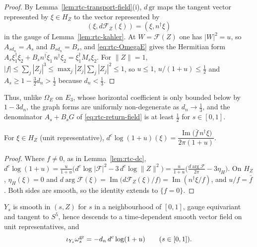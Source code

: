\begin{proof}
By Lemma~\ref{lem:rtc-transport-field}(i), $d\,\mathrm{gr}$ maps the tangent vector represented by $\xi\in H_Z$ to the vector represented by
\[
 (\xi,d\mathcal F_Z(\xi))=(\xi,n^\dagger\xi)
\]
in the gauge of Lemma~\ref{lem:rtc-kahler}. At
$W=\mathcal F(Z)$ one has $|W|^2=u$, so $A_{sd_n}=A_s$ and $B_{sd_n}=B_s$, and \eqref{eq:rtc-OmegaE} gives the Hermitian form
$A_s\xi_1^\dagger\xi_2+B_s\overline{n^\dagger\xi_1}\,n^\dagger\xi_2=\xi_1^\dagger M_s\xi_2$. For $\|Z\|=1$,
$|f|\le\sum_j|Z_j|^3\le\max_j|Z_j|\sum_j|Z_j|^2\le1$, so $u\le1$, $u/(1+u)\le\frac12$ and $A_s\ge1-\frac32d_n>\frac12$ because $d_n<\frac13$.
\end{proof}

Thus, unlike $\Omega_E$ on $E_3$, whose horizontal coefficient is only bounded below by $1-3d_n$, the graph forms are
uniformly non-degenerate as $d_n\to\frac13$, and the denominator $A_s+B_sG$ of \eqref{eq:rtc-return-field} is at least
$\frac12$ for $s\in[0,1]$.

\begin{lemma}\label{lem:rtc-dc-horizontal}
For $\xi\in H_Z$ (unit representative), $d^c\log(1+u)(\xi)=\dfrac{\operatorname{Im}\big(\bar f\,n^\dagger\xi\big)}{2\pi(1+u)}$.
\end{lemma}

\begin{proof}
Where $f\ne0$, as in Lemma~\ref{lem:rtc-dc},
$d^c\log(1+u)=\frac{u}{1+u}\big(d^c\log|\mathcal F|^2-3\,d^c\log\|Z\|^2\big)=\frac{u}{1+u}\big(\frac{d\arg\mathcal F}{2\pi}-3\eta_H\big)$. On
$H_Z$, $\eta_H(\xi)=0$ and $d\arg\mathcal F(\xi)=\operatorname{Im}\big(d\mathcal F_Z(\xi)/f\big)=\operatorname{Im}(n^\dagger\xi/f)$, and $u/f=\bar f$. Both sides
are smooth, so the identity extends to $\{f=0\}$.
\end{proof}

\begin{lemma}\label{lem:rtc-return-field}
$Y_s$ is smooth in $(s,Z)$ for $s$ in a neighbourhood of $[0,1]$, gauge equivariant and tangent to $S^5$, hence descends to a
time-dependent smooth vector field on unit representatives, and
\[
 \iota_{Y_s}\omega^{\rm gr}_s=-d_n\,d^c\log(1+u)\qquad(s\in[0,1]).
\]
\end{lemma}

